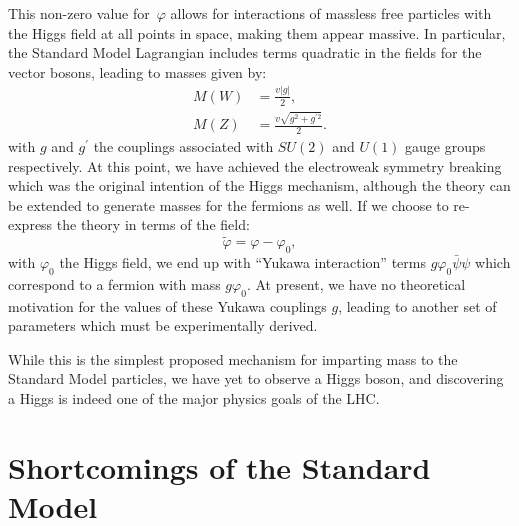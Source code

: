 This non-zero value for~$\varphi$ allows for interactions of massless free particles with the Higgs field at all points in space, making them appear massive.  In particular, the Standard Model Lagrangian includes terms quadratic in the fields for the vector bosons, leading to masses given by:
\begin{align}
  M(W) &= \frac{v|g|}{2}, \\
  M(Z) &= \frac{v\sqrt{g^2 + g^{\prime 2}}}{2}.
\end{align}
with $g$ and $g^\prime$ the couplings associated with $SU(2)$ and $U(1)$ gauge groups respectively.  At this point, we have achieved the electroweak symmetry breaking which was the original intention of the Higgs mechanism, although the theory can be extended to generate masses for the fermions as well.  If we choose to re-express the theory in terms of the field:
\begin{equation}
  \tilde{\varphi} = \varphi - \varphi_0,
\end{equation}
with $\varphi_0$ the Higgs field, we end up with ``Yukawa interaction'' terms $g\varphi_0\bar{\psi}\psi$ which correspond to a fermion with mass $g\varphi_0$.  At present, we have no theoretical motivation for the values of these Yukawa couplings $g$, leading to another set of parameters which must be experimentally derived.

While this is the simplest proposed mechanism for imparting mass to the Standard Model particles, we have yet to observe a Higgs boson, and discovering a Higgs is indeed one of the major physics goals of the LHC.  

\section{Shortcomings of the Standard Model}
\label{sec:shortcomings}

